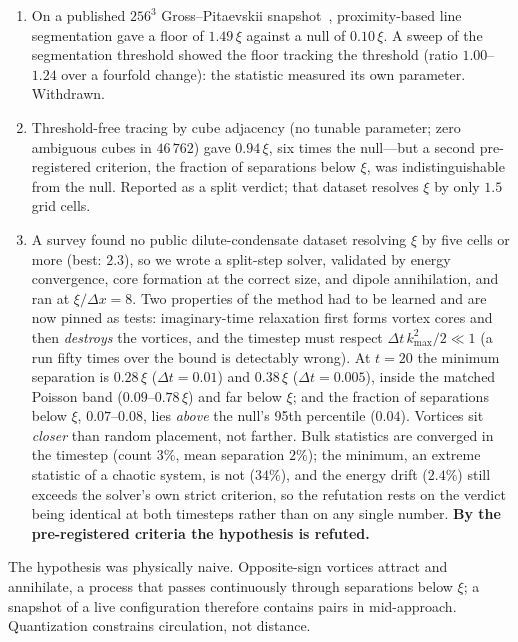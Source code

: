 \documentclass[11pt,a4paper]{article}
\theoremstyle{definition}
\begin{document}
\begin{enumerate}[leftmargin=*,itemsep=3pt]
\item On a published $256^3$ Gross--Pitaevskii snapshot~\cite{PolancoData}, proximity-based
  line segmentation gave a floor of $1.49\,\xi$ against a null of $0.10\,\xi$. A sweep of the
  segmentation threshold showed the floor tracking the threshold (ratio $1.00$--$1.24$ over
  a fourfold change): the statistic measured its own parameter. Withdrawn.
\item Threshold-free tracing by cube adjacency (no tunable parameter; zero ambiguous cubes
  in $46\,762$) gave $0.94\,\xi$, six times the null---but a second pre-registered criterion,
  the fraction of separations below $\xi$, was indistinguishable from the null. Reported as a
  split verdict; that dataset resolves $\xi$ by only $1.5$ grid cells.
\item A survey found no public dilute-condensate dataset resolving $\xi$ by five cells or
  more (best: $2.3$), so we wrote a split-step solver, validated by energy convergence, core
  formation at the correct size, and dipole annihilation, and ran at $\xi/\Delta x=8$.
  Two properties of the method had to be learned and are now pinned as tests:
  imaginary-time relaxation first forms vortex cores and then \emph{destroys} the vortices,
  and the timestep must respect $\Delta t\,k_{\max}^2/2\ll1$ (a run fifty times over the
  bound is detectably wrong). At $t=20$ the
  minimum separation is $0.28\,\xi$ ($\Delta t=0.01$) and $0.38\,\xi$ ($\Delta t=0.005$),
  inside the matched Poisson band ($0.09$--$0.78\,\xi$) and far below $\xi$; and the fraction
  of separations below $\xi$, $0.07$--$0.08$, lies \emph{above} the null's 95th percentile
  ($0.04$). Vortices sit \emph{closer} than random placement, not farther. Bulk statistics are
  converged in the timestep (count $3\%$, mean separation $2\%$); the minimum, an extreme
  statistic of a chaotic system, is not ($34\%$), and the energy drift ($2.4\%$) still
  exceeds the solver's own strict criterion, so the refutation rests on the verdict being
  identical at both timesteps rather than on any single number. \textbf{By the
  pre-registered criteria the hypothesis is refuted.}
\end{enumerate}
The hypothesis was physically naive. Opposite-sign vortices attract and annihilate, a process
that passes continuously through separations below $\xi$; a snapshot of a live configuration
therefore contains pairs in mid-approach. Quantization constrains circulation, not distance.
\end{document}
